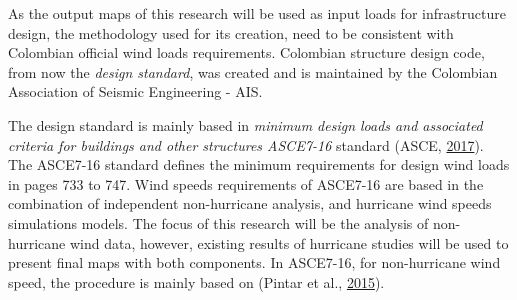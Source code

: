 \documentclass[12pt,twoside]{reedthesis}
\begin{document}
As the output maps of this research will be used as input loads for infrastructure design, the methodology used for its creation, need to be consistent with Colombian official wind loads requirements. Colombian structure design code, from now the \emph{design standard}, was created and is maintained by the Colombian Association of Seismic Engineering - AIS.

The design standard is mainly based in \emph{minimum design loads and associated criteria for buildings and other structures ASCE7-16} standard (ASCE, \protect\hyperlink{ref-Asce2017}{2017}). The ASCE7-16 standard defines the minimum requirements for design wind loads in pages 733 to 747. Wind speeds requirements of ASCE7-16 are based in the combination of independent non-hurricane analysis, and hurricane wind speeds simulations models. The focus of this research will be the analysis of non-hurricane wind data, however, existing results of hurricane studies will be used to present final maps with both components. In ASCE7-16, for non-hurricane wind speed, the procedure is mainly based on (Pintar et al., \protect\hyperlink{ref-Pintar2015}{2015}).
\end{document}
